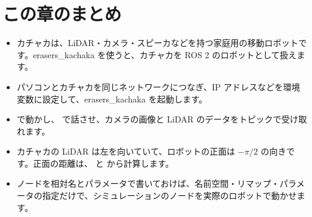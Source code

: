 \section*{この章のまとめ}

\begin{itemize}
  \item カチャカは、LiDAR・カメラ・スピーカなどを持つ家庭用の移動ロボットです。erasers\_kachaka を使うと、カチャカを ROS 2 のロボットとして扱えます。
  \item パソコンとカチャカを同じネットワークにつなぎ、IP アドレスなどを環境変数に設定して、erasers\_kachaka を起動します。
  \item {} で動かし、 で話させ、カメラの画像と LiDAR のデータをトピックで受け取れます。
  \item カチャカの LiDAR は左を向いていて、ロボットの正面は $-\pi/2$ の向きです。正面の距離は、 と  から計算します。
  \item ノードを相対名とパラメータで書いておけば、名前空間・リマップ・パラメータの指定だけで、シミュレーションのノードを実際のロボットで動かせます。
\end{itemize}
